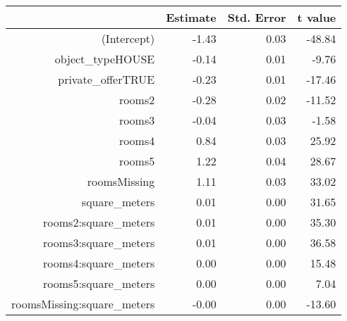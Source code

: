 \begin{table}[ht]
\centering
\begin{tabular}{rrrr}
  \hline
 & Estimate & Std. Error & t value \\ 
  \hline
(Intercept) & -1.43 & 0.03 & -48.84 \\ 
  object\_typeHOUSE & -0.14 & 0.01 & -9.76 \\ 
  private\_offerTRUE & -0.23 & 0.01 & -17.46 \\ 
  rooms2 & -0.28 & 0.02 & -11.52 \\ 
  rooms3 & -0.04 & 0.03 & -1.58 \\ 
  rooms4 & 0.84 & 0.03 & 25.92 \\ 
  rooms5 & 1.22 & 0.04 & 28.67 \\ 
  roomsMissing & 1.11 & 0.03 & 33.02 \\ 
  square\_meters & 0.01 & 0.00 & 31.65 \\ 
  rooms2:square\_meters & 0.01 & 0.00 & 35.30 \\ 
  rooms3:square\_meters & 0.01 & 0.00 & 36.58 \\ 
  rooms4:square\_meters & 0.00 & 0.00 & 15.48 \\ 
  rooms5:square\_meters & 0.00 & 0.00 & 7.04 \\ 
  roomsMissing:square\_meters & -0.00 & 0.00 & -13.60 \\ 
   \hline
\end{tabular}
\end{table}
